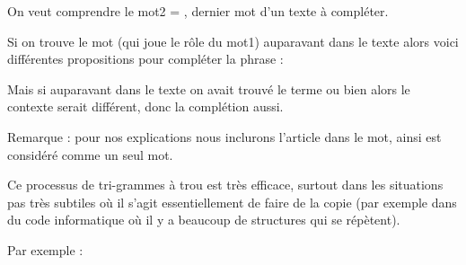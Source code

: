 \documentclass[11pt,class=report,crop=false]{standalone}
\begin{document}
\begin{exemple}
On veut comprendre le mot2 = , dernier mot d'un texte à compléter.

Si on trouve le mot  (qui joue le rôle du mot1) auparavant dans le texte alors voici différentes propositions pour compléter la phrase :

Mais si auparavant dans le texte on avait trouvé le terme  ou bien  alors le contexte serait différent, donc la complétion aussi.



\end{exemple}

Remarque : pour nos explications nous inclurons l'article dans le mot, ainsi  est considéré comme un seul mot.

Ce processus de tri-grammes à trou est très efficace, surtout dans les situations pas très subtiles où il s'agit essentiellement de faire de la copie (par exemple dans du code informatique où il y a beaucoup de structures qui se répètent).

Par exemple :

\end{document}
